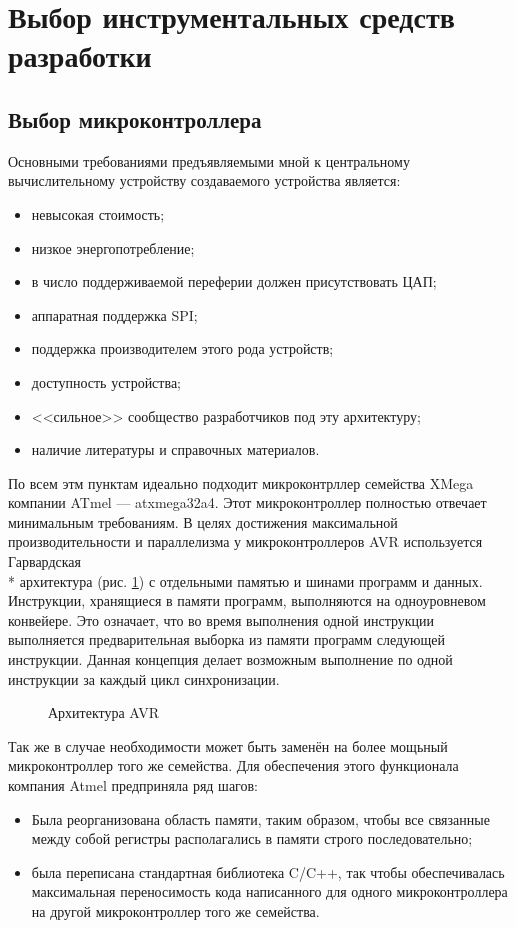 \section{Выбор инструментальных средств разработки}

\subsection{Выбор микроконтроллера}
Основными требованиями предъявляемыми мной к центральному вычислительному устройству
создаваемого устройства является:
\begin{itemize}
	\item{} невысокая стоимость;
	\item{} низкое энергопотребление;
	\item{} в число поддерживаемой переферии должен присутствовать ЦАП;
	\item{} аппаратная поддержка SPI;
	\item{} поддержка производителем этого рода устройств;
	\item{} доступность устройства;
	\item{} <<сильное>> сообщество разработчиков под эту архитектуру;
	\item{} наличие литературы и справочных материалов.
\end{itemize}


По всем этм пунктам идеально подходит микроконтрллер семейства XMega компании ATmel --- atxmega32a4.
Этот микроконтроллер полностью отвечает минимальным требованиям. В целях достижения максимальной
производительности и параллелизма у микроконтроллеров AVR используется
Гарвардская\\*
архитектура (рис. \ref{img:avr_arch}) с отдельными памятью и шинами программ и данных. Инструкции,
хранящиеся в памяти программ, выполняются на одноуровневом конвейере. Это означает, что
во время выполнения одной инструкции выполняется предварительная выборка из памяти программ
следующей инструкции. Данная концепция делает возможным выполнение по одной инструкции за
каждый цикл синхронизации.

\begin{figure}[h]
	\caption{Архитектура AVR}
	\label{img:avr_arch}
\end{figure}


Так же в случае необходимости может быть заменён на более мощьный микроконтроллер того же семейства.
Для обеспечения этого функционала компания Atmel предприняла ряд шагов:
\begin{itemize}
    \item{} Была реорганизована область памяти, таким образом, чтобы все связанные между
            собой регистры располагались в памяти строго последовательно;
    \item{} была переписана стандартная библиотека C/C++, так чтобы обеспечивалась
            максимальная переносимость кода написанного для одного микроконтроллера
            на другой микроконтроллер того же семейства.
\end{itemize}

